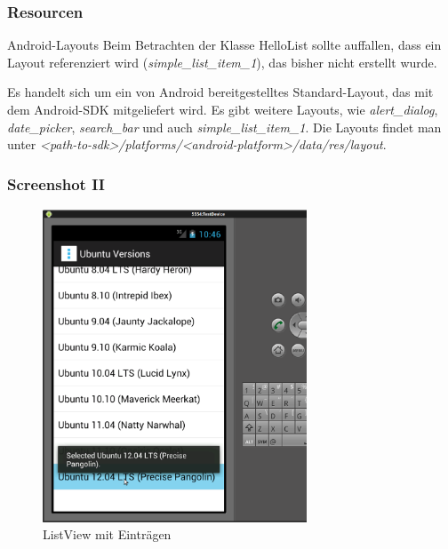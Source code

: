 \begin{frame}
   \frametitle{Resourcen}

   \begin{alertblock}{Android-Layouts}
		Beim Betrachten der Klasse HelloList sollte auffallen, dass ein Layout 
		referenziert wird (\emph{simple\_list\_item\_1}), das bisher nicht erstellt wurde.

		\vspace{5mm}

		Es handelt sich um ein von Android bereitgestelltes Standard-Layout, 
		das mit dem Android-SDK mitgeliefert wird. Es gibt weitere Layouts, wie \emph{alert\_dialog}, 
		\emph{date\_picker}, \emph{search\_bar} und auch \emph{simple\_list\_item\_1}. 
		Die Layouts findet man unter \emph{\textless{}path-to-sdk\textgreater{}/platforms/\textless{}android-platform\textgreater{}/data/res/layout}.
   \end{alertblock}
\end{frame}

\begin{frame}
   \frametitle{Screenshot II}
   \begin{figure}[h!]
     \centering
     \includegraphics[width=0.7\textwidth]{pictures/hello_list.ps}
     \caption{
        ListView mit Einträgen
     }
     \label{fig:hello_list}
   \end{figure}
\end{frame}

